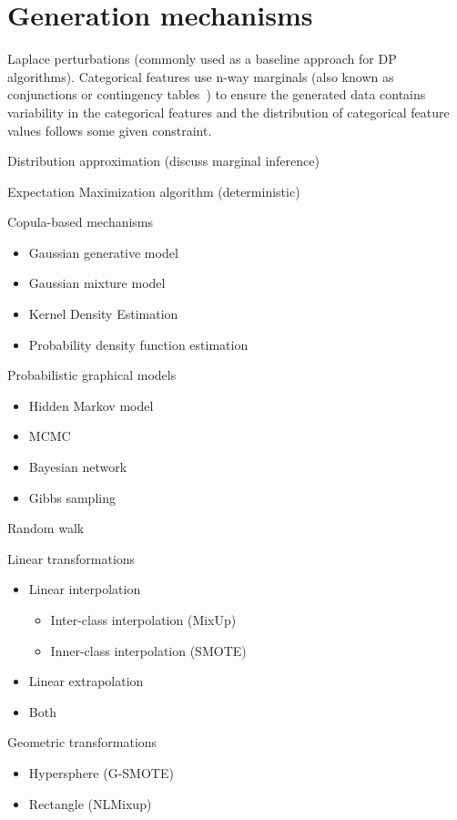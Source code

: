 \documentclass[parskip=full]{scrartcl}
\begin{document}
\section{Generation mechanisms}

Laplace perturbations (commonly used as a baseline approach for DP
algorithms). Categorical features use n-way marginals (also known as
conjunctions or contingency tables~\cite{gaboardi2014dual}) to ensure the generated data contains
variability in the categorical features and the distribution of categorical
feature values follows some given constraint.

Distribution approximation (discuss marginal inference)

Expectation Maximization algorithm (deterministic)

Copula-based mechanisms
\begin{itemize}
    \item Gaussian generative model 
    \item Gaussian mixture model 
    \item Kernel Density Estimation
    \item Probability density function estimation
\end{itemize}

Probabilistic graphical models
\begin{itemize}
    \item Hidden Markov model
    \item MCMC
    \item Bayesian network
    \item Gibbs sampling
\end{itemize}

Random walk

Linear transformations
\begin{itemize}
    \item Linear interpolation
        \begin{itemize}
            \item Inter-class interpolation (MixUp)
            \item Inner-class interpolation (SMOTE)
        \end{itemize}
    \item Linear extrapolation
    \item Both
\end{itemize}

Geometric transformations
\begin{itemize}
    \item Hypersphere (G-SMOTE)
    \item Rectangle (NLMixup)
\end{itemize}
\end{document}
